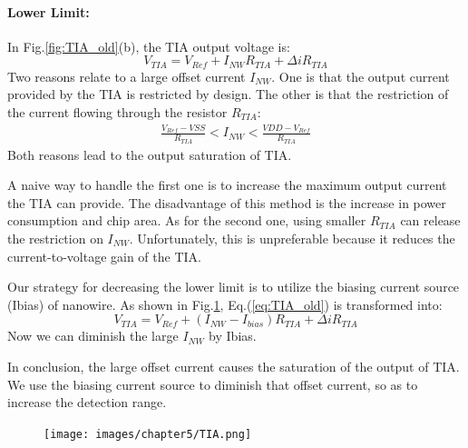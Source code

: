 \paragraph*{Lower Limit:}
In Fig.\ref{fig:TIA_old}(b), the TIA output voltage is:
\begin{equation}
    V_{TIA} = V_{Ref} + I_{NW}R_{TIA} + \Delta iR_{TIA}
    \label{eq:TIA_old}
\end{equation}
Two reasons relate to a large offset current $I_{NW}$.
One is that the output current provided by the TIA is restricted by design.
The other is that the restriction of the current flowing through the resistor $R_{TIA}$:
\begin{align}
    \frac{V_{Ref} - VSS}{R_{TIA}} < I_{NW} < \frac{VDD - V_{Ref}}{R_{TIA}}
\end{align}
Both reasons lead to the output saturation of TIA.

A naive way to handle the first one is to increase the maximum output current the TIA can provide.
The disadvantage of this method is the increase in power consumption and chip area.
As for the second one, using smaller $R_{TIA}$ can release the restriction on $I_{NW}$.
Unfortunately, this is unpreferable because it reduces the current-to-voltage gain of the TIA.

Our strategy for decreasing the lower limit is to utilize the biasing current source (Ibias) of nanowire.
As shown in Fig.\ref{fig:TIA}, Eq.(\ref{eq:TIA_old}) is transformed into:
\begin{equation}
    V_{TIA} = V_{Ref} + (I_{NW} - I_{bias}) R_{TIA} + \Delta iR_{TIA}
    \label{eq:TIA}
\end{equation}
Now we can diminish the large $I_{NW}$ by Ibias.

In conclusion, the large offset current causes the saturation of the output of TIA.
We use the biasing current source to diminish that offset current, so as to increase the detection range.

\begin{figure}[!htbp]
    \centering
        \texttt{[image: images/chapter5/TIA.png]}
    \caption{}
    \label{fig:TIA}
\end{figure}
